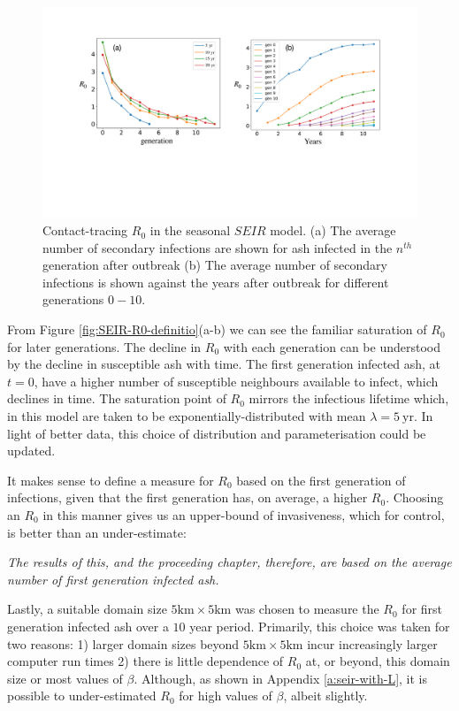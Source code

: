 \begin{figure}
    \centering
    \includegraphics[scale=0.3]{chapter6/figures/fig5-R0-def.pdf}
    \caption{Contact-tracing $R_0$ in the seasonal $SEIR$ model. (a) The average number of secondary infections are shown for ash infected in the $n^{th}$ generation after outbreak (b) The average number of secondary infections is shown against the years after outbreak for different generations $0-10$.}
    \label{fig:SEIR-R0-definition}
\end{figure}

From Figure \ref{fig:SEIR-R0-definitio}(a-b) we can see the familiar saturation of $R_0$ for later generations. The decline in $R_0$ with each generation can be understood by the decline in susceptible ash with time. The first generation infected ash, at $t=0$, have a higher number of susceptible neighbours available to infect, which declines in time. The saturation point of $R_0$ mirrors the infectious lifetime which, in this model are taken to be exponentially-distributed with mean $\lambda=5\ \mathrm{yr}$. In light of better data, this choice of distribution and parameterisation could be updated. 

It makes sense to define a measure for $R_0$ based on the first generation of infections, given that the first generation has, on average, a higher $R_0$. Choosing an $R_0$ in this manner gives us an upper-bound of invasiveness, which for control, is better than an under-estimate:

\textit{The results of this, and the proceeding chapter, therefore, are based on the average number of first generation infected ash.}

Lastly, a suitable domain size $5\mathrm{km} \times 5\mathrm{km}$ was chosen to measure the $R_0$ for first generation infected ash over a $10$ year period. Primarily, this choice was taken for two reasons: 1) larger domain sizes beyond $5\mathrm{km} \times 5\mathrm{km}$ incur increasingly larger computer run times 2) there is little dependence of $R_0$ at, or beyond, this domain size or most values of $\beta$. Although, as shown in Appendix \ref{a:seir-with-L}, it is possible to under-estimated $R_0$ for high values of $\beta$, albeit slightly.

